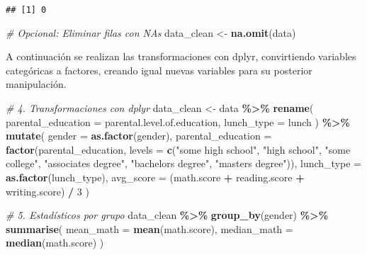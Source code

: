 \documentclass[
]{article}
\newenvironment{Shaded}{\begin{snugshade}}{\end{snugshade}}
\newcommand{\AttributeTok}[1]{\textcolor[rgb]{0.13,0.29,0.53}{#1}}
\newcommand{\CommentTok}[1]{\textcolor[rgb]{0.56,0.35,0.01}{\textit{#1}}}
\newcommand{\DecValTok}[1]{\textcolor[rgb]{0.00,0.00,0.81}{#1}}
\newcommand{\FunctionTok}[1]{\textcolor[rgb]{0.13,0.29,0.53}{\textbf{#1}}}
\newcommand{\NormalTok}[1]{#1}
\newcommand{\OtherTok}[1]{\textcolor[rgb]{0.56,0.35,0.01}{#1}}
\newcommand{\SpecialCharTok}[1]{\textcolor[rgb]{0.81,0.36,0.00}{\textbf{#1}}}
\newcommand{\StringTok}[1]{\textcolor[rgb]{0.31,0.60,0.02}{#1}}
\begin{document}
\begin{verbatim}
## [1] 0
\end{verbatim}

\begin{Shaded}
\begin{Highlighting}[]
\CommentTok{\# Opcional: Eliminar filas con NAs }
\NormalTok{data\_clean }\OtherTok{\textless{}{-}} \FunctionTok{na.omit}\NormalTok{(data)}
\end{Highlighting}
\end{Shaded}

A continuación se realizan las transformaciones con dplyr, convirtiendo
variables categóricas a factores, creando igual nuevas variables para su
posterior manipulación.

\begin{Shaded}
\begin{Highlighting}[]
\CommentTok{\# 4. Transformaciones con dplyr}
\NormalTok{data\_clean }\OtherTok{\textless{}{-}}\NormalTok{ data }\SpecialCharTok{\%\textgreater{}\%}
  \FunctionTok{rename}\NormalTok{(}
    \AttributeTok{parental\_education =} \StringTok{\textasciigrave{}}\AttributeTok{parental.level.of.education}\StringTok{\textasciigrave{}}\NormalTok{, }
    \AttributeTok{lunch\_type =}\NormalTok{ lunch                                  }
\NormalTok{  ) }\SpecialCharTok{\%\textgreater{}\%}
  \FunctionTok{mutate}\NormalTok{(}
    \AttributeTok{gender =} \FunctionTok{as.factor}\NormalTok{(gender),}
    \AttributeTok{parental\_education =} \FunctionTok{factor}\NormalTok{(parental\_education,}
                                \AttributeTok{levels =} \FunctionTok{c}\NormalTok{(}\StringTok{"some high school"}\NormalTok{, }\StringTok{"high school"}\NormalTok{, }\StringTok{"some college"}\NormalTok{,}
                                           \StringTok{"associate\textquotesingle{}s degree"}\NormalTok{, }\StringTok{"bachelor\textquotesingle{}s degree"}\NormalTok{, }\StringTok{"master\textquotesingle{}s degree"}\NormalTok{)),}
    \AttributeTok{lunch\_type =} \FunctionTok{as.factor}\NormalTok{(lunch\_type), }
    \AttributeTok{avg\_score =}\NormalTok{ (math.score }\SpecialCharTok{+}\NormalTok{ reading.score }\SpecialCharTok{+}\NormalTok{ writing.score) }\SpecialCharTok{/} \DecValTok{3}
\NormalTok{  )}

\CommentTok{\# 5. Estadísticos por grupo }
\NormalTok{data\_clean }\SpecialCharTok{\%\textgreater{}\%}
  \FunctionTok{group\_by}\NormalTok{(gender) }\SpecialCharTok{\%\textgreater{}\%}
  \FunctionTok{summarise}\NormalTok{(}
    \AttributeTok{mean\_math =} \FunctionTok{mean}\NormalTok{(math.score),}
    \AttributeTok{median\_math =} \FunctionTok{median}\NormalTok{(math.score)}
\NormalTok{  )}
\end{Highlighting}
\end{Shaded}
\end{document}
